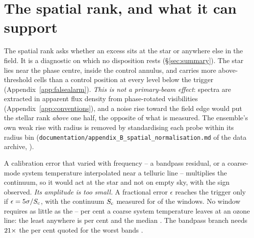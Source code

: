 \section{The spatial rank, and what it can support}
\label{app:radius}

The spatial rank asks whether an excess sits at the star or anywhere else in
the field. It is a diagnostic on which no disposition rests
(\S\ref{sec:summary}). The star lies near the phase centre, inside the control
annulus, and carries more above-threshold cells than a control position at
every level below the trigger (Appendix~\ref{app:falsealarm}). \emph{This is
not a primary-beam effect}: spectra are extracted in apparent flux density
from phase-rotated visibilities (Appendix~\ref{app:conventions}), and a noise
rise toward the field edge would put the stellar rank \emph{above} one half,
the opposite of what is measured. The ensemble's own weak rise with radius is
removed by standardising each probe within its radius bin
(\texttt{documentation/\allowbreak appendix\_B\_spatial\_normalisation.md} of
the data archive, \citealt{SIdeposit}).

A calibration error that varied with frequency -- a bandpass residual, or a
coarse-mode system temperature interpolated near a telluric line
\citep{ALMATsys2018} -- multiplies the continuum, so it would act at the star
and not on empty sky, with the sign observed. \emph{Its amplitude is too
small.} A fractional error $\epsilon$ reaches the trigger only if
$\epsilon=5\sigma/S_{\rm c}$, with the continuum $S_{\rm c}$ measured for
\CyNWinMeas{} of the \CyNWinTot{} windows. No window requires as little as the
\CySpecTsysLo--\CySpecTsysHi{} per cent a coarse system temperature leaves at
an ozone line: the least anywhere is \CyEpsMinPct{} per cent and the median
\CyEpsMedPct. The bandpass branch needs $21\times$ the
\CdSpecBpWorst{} per cent quoted for the worst bands
\citep{ALMAKBBandpass,ALMATechNote15}.

